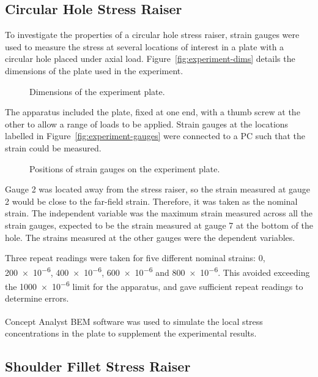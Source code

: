\documentclass[a4paper,11pt,twocolumn]{article}
\newcommand{\BEM}{\textsc{BEM}\xspace}
\begin{document}
\subsection{Circular Hole Stress Raiser}

To investigate the properties of a circular hole stress raiser, strain gauges
were used to measure the stress at several locations of interest in a plate 
with a circular hole placed under axial load. Figure~\vref{fig:experiment-dims} 
details the dimensions of the plate used in the experiment.

\begin{figure}[h]
    \centering
    \def\svgwidth{\linewidth}
    
    \caption{Dimensions of the experiment plate.}
    \label{fig:experiment-dims}
\end{figure}

The apparatus included the plate, fixed at one end, with a thumb screw at the 
other to allow a range of loads to be applied. Strain gauges at the 
locations labelled in Figure~\vref{fig:experiment-gauges} were connected to a 
\textsc{PC} such that the strain could be measured.

\begin{figure}[h]
    \centering
    \def\svgwidth{\linewidth}
    
    \caption{Positions of strain gauges on the experiment plate.}
    \label{fig:experiment-gauges}
\end{figure}

Gauge 2 was located away from the stress raiser, so the strain measured at 
gauge 2 would be close to the far-field strain. Therefore, it was taken as the
nominal strain. The independent variable was the maximum strain measured across all the strain gauges, expected to be the strain measured at gauge 7 at the  bottom of the hole. The strains measured at the other gauges were the dependent variables.

Three repeat readings were taken for five different nominal strains: 0, 
\num{200e-6}, \num{400e-6}, \num{600e-6} and \num{800e-6}. This avoided
exceeding the \num{1000e-6} limit for the apparatus, and gave sufficient repeat
readings to determine errors.

Concept Analyst\textsuperscript{\textregistered} \BEM software was used to
simulate the local stress concentrations in the plate to supplement the
experimental results.

\subsection{Shoulder Fillet Stress Raiser}
\end{document}
